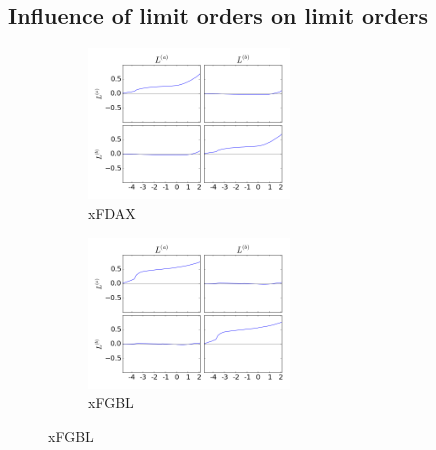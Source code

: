 \documentclass[a4paper,11pt]{article}
\begin{document}
\subsection{Influence of limit orders on limit orders}
\label{LL}
\begin{figure}[H]
        \begin{subfigure}[b]{0.45\textwidth}
                \includegraphics[width=\textwidth,height=40mm]{xFDAXPA_PB_TA_TB_LA_LB_CA_CB__LALB-_LALBcausality.png}
                \caption{xFDAX}
        \end{subfigure}
        \begin{subfigure}[b]{0.45\textwidth}
                \includegraphics[width=\textwidth,height=40mm]{xFGBLPA_PB_TA_TB_LA_LB_CA_CB__LALB-_LALBcausality.png}
                \caption{xFGBL}
        \end{subfigure}
\end{figure}
\end{document}
